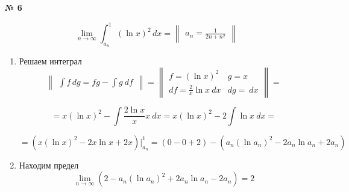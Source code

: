 \documentclass{article}
\begin{document}
\textbf{№ 6} 

\begingroup

\Large

$$ \lim\limits_{n \to \infty} \int_{a_n}^{1} (\ln{x})^2 \,dx 
= \begin{Vmatrix} a_n = \frac{1}{2n+n^2} \end{Vmatrix} $$

\begin{enumerate}
\item Решаем интеграл
\\
$$ \begin{Vmatrix} \int f \,dg = fg - \int g \ df \end{Vmatrix} =
   \begin{Vmatrix} f = (\ln{x})^2      & g = x \\
                  df = \frac{2}{x} \ln{x} \ dx & dg = \ dx  \end{Vmatrix} =$$

$$ = x (\ln{x})^2 - \int \frac{2\ln{x}}{x} x \ dx 
= x (\ln{x})^2 - 2 \int \ln{x} \ dx 
= $$

$$ = \left( x (\ln{x})^2 - 2x \ln{x} + 2x \right) \bigg\rvert_{a_n}^{1} 
= \left(0 - 0 + 2 \right) - \left( a_n (\ln{a_n})^2 -2a_n \ln{a_n} +2a_n \right) $$

\item Находим предел
$$ \lim\limits_{n \to \infty} \left(2 -  a_n (\ln{a_n})^2 + 2a_n \ln{a_n} - 2a_n \right)
= 2$$

\end{enumerate}
\endgroup
\end{document}
